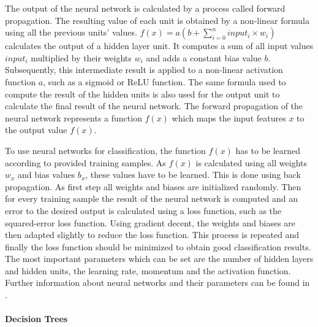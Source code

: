 The output of the neural network is calculated by a process called forward propagation. The resulting value of each unit is obtained by a non-linear formula using all the previous units' values. $f(x) = a(b + \sum_{i=0}^{n} input_i \times w_{i})$ calculates the output of a hidden layer unit. It computes a sum of all input values $input_i$ multiplied by their weights $w_i$ and adds a constant bias value $b$. Subsequently, this intermediate result is applied to a non-linear activation function $a$, such as a sigmoid or ReLU function. The same formula used to compute the result of the hidden units is also used for the output unit to calculate the final result of the neural network. The forward propagation of the neural network represents a function $f(x)$ which maps the input features $x$ to the output value $f(x)$.

To use neural networks for classification, the function $f(x)$ has to be learned according to provided training samples. As $f(x)$ is calculated using all weights $w_x$ and bias values $b_x$, these values have to be learned. This is done using back propagation. As first step all weights and biases are initialized randomly. Then for every training sample the result of the neural network is computed and an error to the desired output is calculated using a loss function, such as the squared-error loss function. Using gradient decent, the weights and biases are then adapted slightly to reduce the loss function. This process is repeated and finally the loss function should be minimized to obtain good classification results. The most important parameters which can be set are the number of hidden layers and hidden units, the learning rate, momentum and the activation function. Further information about neural networks and their parameters can be found in \cite{Hall2016_DataMining_ML}.







\paragraph{Decision Trees}

